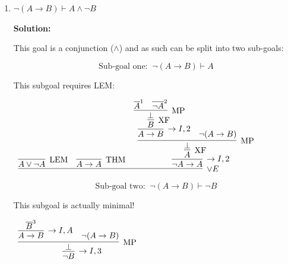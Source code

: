 \documentclass[11pt]{report}
\newcommand{\temp}[2]{{\overline{#2}}^{#1}}
\begin{document}
\begin{enumerate}
\begin{enumerate}
		\begin{tiny}
		\begin{center}
			$\begin{array}{c}
				\infer[\RAA,2]{(A \to D) \lor (C \to B)}
					{\infer[\MP]{\bot}
						{\infer[\lor I_{L}]{(A \to D) \lor (C \to B)}
							{\infer[\to I,1]{A \to D}
								{\infer[\XF]{D}
									{\infer[\MP]{\bot}
										{\infer[\lor I_{R}]{(A \to D) \lor (C \to B)}
											{\infer[\to I]{C \to B}
												{\infer[\MP]{B}
													{\temp{1}{A}
													&
													A \to B}}}
										&
										\temp{2}{\lnot((A \to D) \lor (C \to B))}}}}}
						&
						\temp{2}{\lnot((A \to D) \lor (C \to B))}}}
			\end{array}$
		\end{center}
		\end{tiny}
		
		\newpage
		\item $\lnot (A \to B) \vdash A \land \lnot B$  
		
		\textbf{Solution:}

		This goal is a conjunction ($\land$) and as such can be split into two sub-goals: 

		$$\text{Sub-goal one: } \ \lnot (A \to B) \vdash A$$

		This subgoal requires LEM:

		\begin{center}
			$\begin{array}{c}
				\infer[\lor E]{}
					{\infer[\LEM]{A \lor \lnot A}{}
					&
					\infer[\THM]{A \to A}{}
					&
					\infer[\to I,2]{\lnot A \to A}
						{\infer[\XF]{A}
							{\infer[\MP]{\bot}
								{\infer[\to I,2]{A \to B}
									{\infer[\XF]{B}
										{\infer[\MP]{\bot}
											{\temp{1}{A}&\temp{2}{\lnot A}}}}
								&
								\lnot(A \to B)}}}}
			\end{array}$
		\end{center}

		$$\text{Sub-goal two: } \ \lnot (A \to B) \vdash \lnot B$$

		This subgoal is actually minimal!

		\begin{center}
			$\begin{array}{c}
				\infer[\to I,3]{\lnot B}
					{\infer[\MP]{\bot}
						{\infer[\to I, A]{A \to B}{\temp{3}{B}}
						&
						\lnot (A \to B)}}
			\end{array}$
		\end{center}


\end{enumerate}
\end{enumerate}
\end{document}
